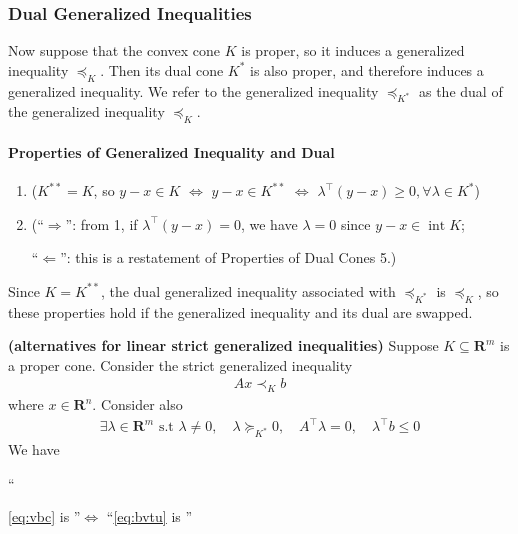 \documentclass{article}
\newcommand{\bfs}[1]{\textbf{({#1}) }}
\newcommand{\inte}{\operatorname{int}}
\begin{document}
\subsubsection{Dual Generalized Inequalities}
Now suppose that the convex cone $K$ is proper, so it induces a generalized inequality $\preceq_{K} .$ Then its dual cone $K^{*}$ is also proper, and therefore induces a generalized inequality. We refer to the generalized inequality $\preceq_{K^{*}}$ as the dual of the generalized inequality $\preceq_{K}$.

\paragraph{Properties of Generalized Inequality and Dual}
\begin{enumerate}
    \item {}
    
    ($K^{**}=K$, so $y-x\in K$ $\Longleftrightarrow$ $y-x\in K^{**}$ $\Longleftrightarrow$ $\lambda^{\top}(y-x)\ge 0, \forall \lambda \in K^*$)
    \item {}
    
    (``$\Rightarrow$'':  from 1, if $\lambda^{\top}(y-x)=0$, we have $\lambda =0$ since $y-x\in \inte K$; 
    
    ``$\Leftarrow$'': this is a restatement of Properties of Dual Cones 5.)
    
    
\end{enumerate}
\begin{rema}
Since $K=K^{* *}$, the dual generalized inequality associated with $\preceq_{K^{*}}$ is $\preceq_{K}$, so these properties hold if the generalized inequality and its dual are swapped.
\end{rema}

\begin{thma}{\bfs{alternatives for linear strict generalized inequalities}}\label{exm:fafdavcz}\label{eq:yrrew}
 Suppose $K \subseteq \mathbf{R}^{m}$ is a proper cone. Consider the strict generalized inequality
\begin{align}
A x \prec_{K} b\label{eq:bvtu}
\end{align}
where $x \in \mathbf{R}^{n}$. Consider also
\begin{align}
\exists \lambda\in \mathbf{R}^m \text{ s.t } \lambda \neq 0, \quad \lambda \succeq_{K^{*}} 0, \quad A^{\top} \lambda=0, \quad \lambda^{\top} b \leq 0 \label{eq:vbc}
\end{align}
We have 

``\centerline{\cref{eq:vbc} is   ''$\Longleftrightarrow$ ``\cref{eq:bvtu} is ''}

\end{thma}
\end{document}
